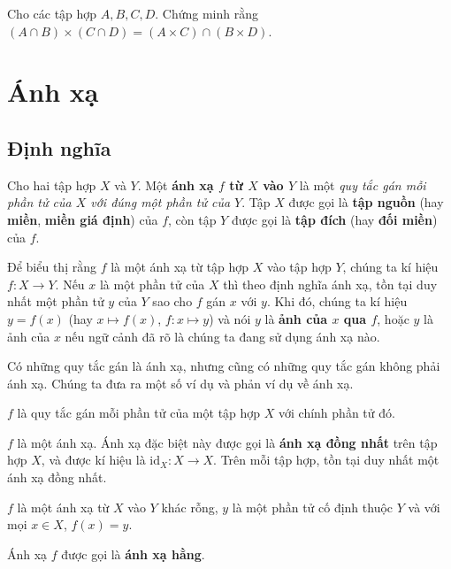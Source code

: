 \begin{exercise}\label{cartesian-product:exercise3}
    Cho các tập hợp $A, B, C, D$. Chứng minh rằng $(A\cap B)\times (C\cap D) = (A\times C)\cap (B\times D)$.
\end{exercise}

\section{Ánh xạ}\label{section:mappings}

\subsection{Định nghĩa}

\begin{definition}[Ánh xạ]
    Cho hai tập hợp $X$ và $Y$. Một \textbf{ánh xạ $f$ từ $X$ vào $Y$} là một \textit{quy tắc gán mỗi phần tử của $X$ với đúng một phần tử của $Y$}. Tập $X$ được gọi là \textbf{tập nguồn} (hay \textbf{miền}, \textbf{miền giá định}) của $f$, còn tập $Y$ được gọi là \textbf{tập đích} (hay \textbf{đối miền}) của $f$.

    Để biểu thị rằng $f$ là một ánh xạ từ tập hợp $X$ vào tập hợp $Y$, chúng ta kí hiệu $f: X\to Y$. Nếu $x$ là một phần tử của $X$ thì theo định nghĩa ánh xạ, tồn tại duy nhất một phần tử $y$ của $Y$ sao cho $f$ gán $x$ với $y$. Khi đó, chúng ta kí hiệu $y = f(x)$ (hay $x\mapsto f(x)$, $f: x \mapsto y$) và nói $y$ là \textbf{ảnh của $x$ qua $f$}, hoặc $y$ là ảnh của $x$ nếu ngữ cảnh đã rõ là chúng ta đang sử dụng ánh xạ nào.
\end{definition}

Có những quy tắc gán là ánh xạ, nhưng cũng có những quy tắc gán không phải ánh xạ. Chúng ta đưa ra một số ví dụ và phản ví dụ về ánh xạ.

\begin{example}
    $f$ là quy tắc gán mỗi phần tử của một tập hợp $X$ với chính phần tử đó.

    \noindent $f$ là một ánh xạ. Ánh xạ đặc biệt này được gọi là \textbf{ánh xạ đồng nhất} trên tập hợp $X$, và được kí hiệu là $\text{id}_{X}: X\to X$. Trên mỗi tập hợp, tồn tại duy nhất một ánh xạ đồng nhất.
\end{example}

\begin{example}
    $f$ là một ánh xạ từ $X$ vào $Y$ khác rỗng, $y$ là một phần tử cố định thuộc $Y$ và với mọi $x\in X$, $f(x) = y$.

    \noindent Ánh xạ $f$ được gọi là \textbf{ánh xạ hằng}.
\end{example}

